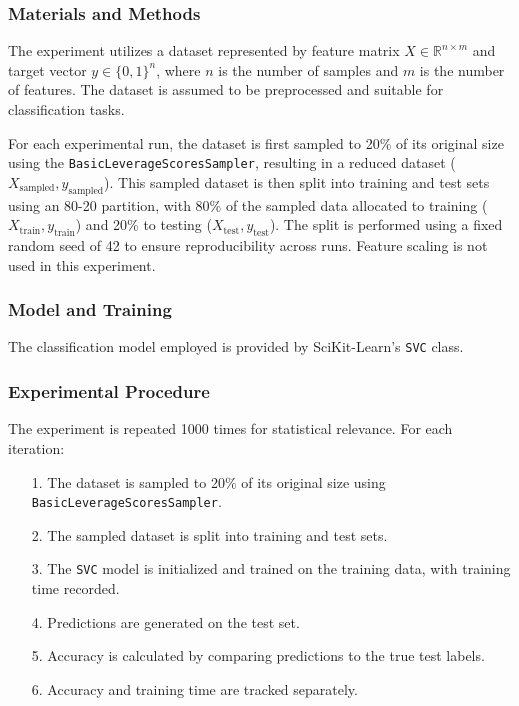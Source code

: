 \documentclass{article}
\theoremstyle{plain}
\theoremstyle{definition}
\theoremstyle{remark}
\begin{document}
\subsubsection{Materials and Methods}

The experiment utilizes a dataset represented by feature matrix $ X \in \mathbb{R}^{n \times m} $ and target vector $ y \in \{0, 1\}^n $, where $ n $ is the number of samples and $ m $ is the number of features. The dataset is assumed to be preprocessed and suitable for classification tasks.

For each experimental run, the dataset is first sampled to 20\% of its original size using the \texttt{BasicLeverageScoresSampler}, resulting in a reduced dataset ($ X_{\text{sampled}}, y_{\text{sampled}} $). This sampled dataset is then split into training and test sets using an 80-20 partition, with 80\% of the sampled data allocated to training ($ X_{\text{train}}, y_{\text{train}} $) and 20\% to testing ($ X_{\text{test}}, y_{\text{test}} $). The split is performed using a fixed random seed of 42 to ensure reproducibility across runs. Feature scaling is not used in this experiment.

\subsubsection{Model and Training}

The classification model employed is provided by SciKit-Learn's \texttt{SVC} class.

\subsubsection{Experimental Procedure}

The experiment is repeated 1000 times for statistical relevance. For each iteration:

\begin{itemize}
	\item [1.] The dataset is sampled to 20\% of its original size using \texttt{BasicLeverageScoresSampler}.
	\item [2.] The sampled dataset is split into training and test sets.
	\item [3.] The \texttt{SVC} model is initialized and trained on the training data, with training time recorded.
	\item [4.] Predictions are generated on the test set.
	\item [5.] Accuracy is calculated by comparing predictions to the true test labels.
	\item [6.] Accuracy and training time are tracked separately.
\end{itemize}
\end{document}
